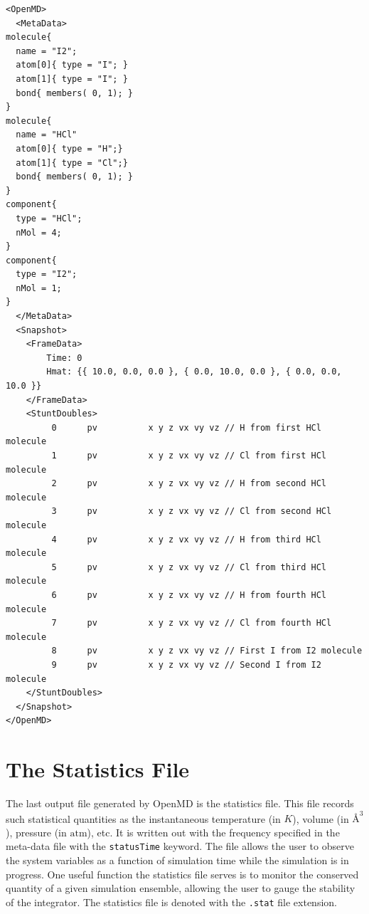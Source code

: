 \documentclass[]{book}
\begin{document}
\begin{lstlisting}[float,caption={Example declaration of the
$\text{I}_2$ molecule and the HCl molecule in $<$MetaData$>$ and
$<$Snapshot$>$ blocks.  Note that even though $\text{I}_2$ is
declared before HCl, the $<$Snapshot$>$ block follows the order {\it in
which the components were included}.}, label=sch:initEx1] 
<OpenMD>
  <MetaData>
molecule{
  name = "I2";
  atom[0]{ type = "I"; }
  atom[1]{ type = "I"; }
  bond{ members( 0, 1); }
}
molecule{
  name = "HCl"
  atom[0]{ type = "H";}
  atom[1]{ type = "Cl";}
  bond{ members( 0, 1); }
}
component{
  type = "HCl";
  nMol = 4;
}
component{
  type = "I2";
  nMol = 1;
}
  </MetaData>
  <Snapshot>
    <FrameData>
        Time: 0
        Hmat: {{ 10.0, 0.0, 0.0 }, { 0.0, 10.0, 0.0 }, { 0.0, 0.0, 10.0 }}
    </FrameData>
    <StuntDoubles>
         0      pv          x y z vx vy vz // H from first HCl molecule 
         1      pv          x y z vx vy vz // Cl from first HCl molecule
         2      pv          x y z vx vy vz // H from second HCl molecule 
         3      pv          x y z vx vy vz // Cl from second HCl molecule
         4      pv          x y z vx vy vz // H from third HCl molecule 
         5      pv          x y z vx vy vz // Cl from third HCl molecule
         6      pv          x y z vx vy vz // H from fourth HCl molecule 
         7      pv          x y z vx vy vz // Cl from fourth HCl molecule
         8      pv          x y z vx vy vz // First I from I2 molecule
         9      pv          x y z vx vy vz // Second I from I2 molecule
    </StuntDoubles>
  </Snapshot>
</OpenMD>
\end{lstlisting}

\section{The Statistics File}

The last output file generated by {\sc OpenMD} is the statistics
file. This file records such statistical quantities as the
instantaneous temperature (in $K$), volume (in $\mbox{\AA}^{3}$),
pressure (in $\mbox{atm}$), etc. It is written out with the frequency
specified in the meta-data file with the
\texttt{statusTime} keyword. The file allows the user to observe the
system variables as a function of simulation time while the simulation
is in progress. One useful function the statistics file serves is to
monitor the conserved quantity of a given simulation ensemble,
allowing the user to gauge the stability of the integrator. The
statistics file is denoted with the \texttt{.stat} file extension.
\end{document}

